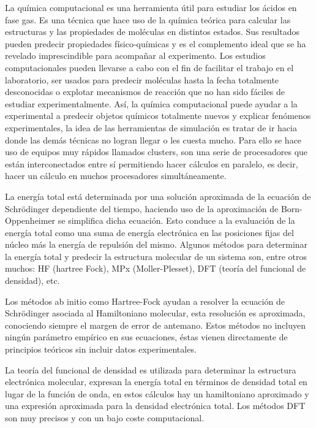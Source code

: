 La química computacional es una herramienta útil para estudiar los ácidos en fase gas. Es una técnica que hace uso de la química teórica para calcular las estructuras y las propiedades de moléculas en distintos estados. Sus resultados pueden predecir propiedades físico-químicas y es el complemento ideal que se ha revelado imprescindible para acompañar al experimento. Los estudios computacionales pueden llevarse a cabo con el fin de facilitar el trabajo en el laboratorio, ser usados para predecir moléculas hasta la fecha totalmente desconocidas o explotar mecanismos de reacción que no han sido fáciles de estudiar experimentalmente. Así, la química computacional puede ayudar a la experimental a predecir objetos químicos totalmente nuevos y explicar fenómenos experimentales, la idea de las herramientas de simulación es tratar de ir hacia donde las demás técnicas no logran llegar o les cuesta mucho. Para ello se hace uso de equipos muy rápidos llamados clusters, son una serie de procesadores que están interconectados entre sí permitiendo hacer cálculos en paralelo, es decir, hacer un cálculo en muchos procesadores simultáneamente.

La energía total está determinada por una solución aproximada de la ecuación de Schrödinger dependiente del tiempo, haciendo uso de la aproximación de Born-Oppenheimer se simplifica dicha ecuación. Esto conduce a la evaluación de la energía total como una suma de energía electrónica en las posiciones fijas del núcleo más la energía de repulsión del mismo. Algunos métodos para determinar la energía total y predecir la estructura molecular de un sistema son, entre otros muchos: HF (hartree Fock), MPx (Moller-Plesset), DFT (teoría del funcional de densidad), etc. \cite {quimica2}

Los métodos ab initio como Hartree-Fock ayudan a resolver la ecuación de Schrödinger asociada al Hamiltoniano molecular, esta resolución es aproximada, conociendo siempre el margen de error de antemano. Estos métodos no incluyen ningún parámetro empírico en sus ecuaciones, éstas vienen directamente de principios teóricos sin incluir datos experimentales.

La teoría del funcional de densidad es utilizada para determinar la estructura electrónica molecular, expresan la energía total en términos de densidad total en lugar de la función de onda, en estos cálculos hay un hamiltoniano aproximado y una expresión aproximada para la densidad electrónica total. Los métodos DFT son muy precisos y con un bajo coste computacional.

